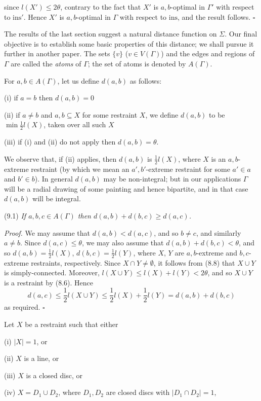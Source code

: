 \noindent since $l(X') \le 2\theta$, contrary to the fact that $X'$ is $a, b$-optimal in $\Gamma'$ with respect to $\text{ins}'$. Hence $X'$ is $a, b$-optimal in $\Gamma$ with respect to $\text{ins}$, and the result follows. $\square$


The results of the last section suggest a natural distance function on $\Sigma$. Our final objective is to establish some basic properties of this distance; we shall pursue it further in another paper. The sets $\{v\}$ ($v \in V(\Gamma)$) and the edges and regions of $\Gamma$ are called the \textit{atoms} of $\Gamma$; the set of atoms is denoted by $A(\Gamma)$.

For $a, b \in A(\Gamma)$, let us define $d(a, b)$ as follows:

\hspace*{12pt}(i) if $a = b$ then $d(a, b) = 0$

\hspace*{12pt}(ii) if $a \ne b$ and $a, b \subseteq X$ for some restraint $X$, we define $d(a, b)$ to be $\min \frac{1}{2}l(X)$, taken over all such $X$

\hspace*{12pt}(iii) if (i) and (ii) do not apply then $d(a, b) = \theta$.

We observe that, if (ii) applies, then $d(a, b)$ is $\frac{1}{2}l(X)$, where $X$ is an $a, b$-extreme restraint (by which we mean an $a', b'$-extreme restraint for some $a' \in a$ and $b' \in b$). In general $d(a, b)$ may be non-integral; but in our applications $\Gamma$ will be a radial drawing of some painting and hence bipartite, and in that case $d(a, b)$ will be integral.

\stmt
(9.1) \textit{If $a, b, c \in A(\Gamma)$ then $d(a, b) + d(b, c) \ge d(a, c)$.}

\textit{Proof.} We may assume that $d(a, b) < d(a, c)$, and so $b \ne c$, and similarly $a \ne b$. Since $d(a, c) \le \theta$, we may also assume that $d(a, b) + d(b, c) < \theta$, and so $d(a, b) = \frac{1}{2}l(X)$, $d(b, c) = \frac{1}{2}l(Y)$, where $X$, $Y$ are $a, b$-extreme and $b, c$-extreme restraints, respectively. Since $X \cap Y \ne \emptyset$, it follows from (8.8) that $X \cup Y$ is simply-connected. Moreover, $l(X \cup Y) \le l(X) + l(Y) < 2\theta$, and so $X \cup Y$ is a restraint by (8.6). Hence
\begin{equation*}
d(a, c) \le \frac{1}{2}l(X \cup Y) \le \frac{1}{2}l(X) + \frac{1}{2}l(Y) = d(a, b) + d(b, c)
\end{equation*}
as required. $\square$

Let $X$ be a restraint such that either

\hspace*{12pt}(i) $|X| = 1$, or

\hspace*{12pt}(ii) $X$ is a line, or

\hspace*{12pt}(iii) $X$ is a closed disc, or

\hspace*{12pt}(iv) $X = D_1 \cup D_2$, where $D_1, D_2$ are closed discs with $|D_1 \cap D_2| = 1$,
